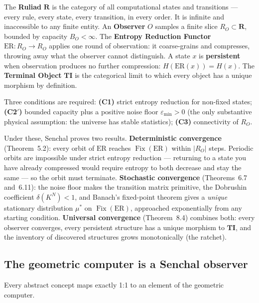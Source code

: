 \documentclass[12pt,a4paper]{article}
\theoremstyle{definition}
\theoremstyle{remark}
\begin{document}
The \textbf{Ruliad} $\mathbf{R}$ is the category of all computational states
and transitions --- every rule, every state, every transition, in every order.
It is infinite and inaccessible to any finite entity.  An \textbf{Observer}
$O$ samples a finite slice $R_O \subset \mathbf{R}$, bounded by capacity
$B_O < \infty$.  The \textbf{Entropy Reduction Functor}
$\mathrm{ER} : R_O \to R_O$ applies one round of observation: it
coarse-grains and compresses, throwing away what the observer cannot
distinguish.  A state $x$ is \textbf{persistent} when observation produces
no further compression: $H(\mathrm{ER}(x)) = H(x)$.  The
\textbf{Terminal Object} $\mathbf{TI}$ is the categorical limit to which
every object has a unique morphism by definition.

Three conditions are required: \textbf{(C1)} strict entropy reduction for
non-fixed states; \textbf{(C2$'$)} bounded capacity plus a positive noise
floor $\varepsilon_{\min} > 0$ (the only substantive physical assumption:
the universe has stable statistics); \textbf{(C3)} connectivity of $R_O$.

Under these, Senchal proves two results.  \textbf{Deterministic convergence}
(Theorem~5.2): every orbit of $\mathrm{ER}$ reaches $\operatorname{Fix}(\mathrm{ER})$
within $|R_O|$ steps.  Periodic orbits are impossible under strict entropy
reduction --- returning to a state you have already compressed would require
entropy to both decrease and stay the same --- so the orbit must terminate.
\textbf{Stochastic convergence} (Theorems~6.7 and~6.11): the noise floor
makes the transition matrix primitive, the Dobrushin coefficient
$\delta(K^N) < 1$, and Banach's fixed-point theorem gives a \emph{unique}
stationary distribution $\mu^*$ on $\operatorname{Fix}(\mathrm{ER})$,
approached exponentially from any starting condition.  \textbf{Universal
convergence} (Theorem~8.4) combines both: every observer converges, every
persistent structure has a unique morphism to $\mathbf{TI}$, and the
inventory of discovered structures grows monotonically (the ratchet).

\subsection{The geometric computer is a Senchal observer}

Every abstract concept maps exactly 1:1 to an element of the geometric computer.
\end{document}
